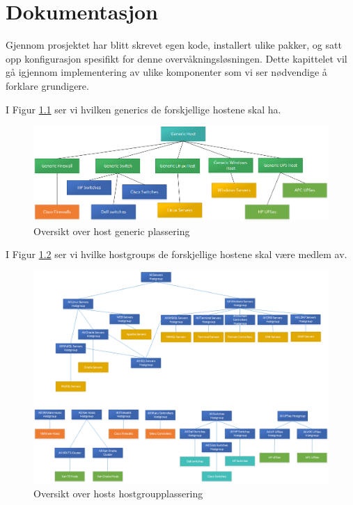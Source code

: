 \chapter{Dokumentasjon}

Gjennom prosjektet har blitt skrevet egen kode, installert ulike pakker, og satt opp konfigurasjon spesifikt for denne overvåkningsløsningen. Dette kapittelet vil gå igjennom implementering av ulike komponenter som vi ser nødvendige å forklare grundigere.


I Figur \ref{hostfigur} ser vi hvilken generics de forskjellige hostene skal ha.

\begin{figure}[H]
    \centering
    \includegraphics[scale=0.5]{img/host}
    \caption{Oversikt over host generic plassering}
    \label{hostfigur}
\end{figure}

I Figur \ref{hostgroupfigur} ser vi hvilke hostgroups de forskjellige hostene skal være medlem av.

\begin{figure}[H]
    \centering
    \includegraphics[scale=0.5]{img/hostgroups}
    \caption{Oversikt over hosts hostgroupplassering}
    \label{hostgroupfigur}
\end{figure}



